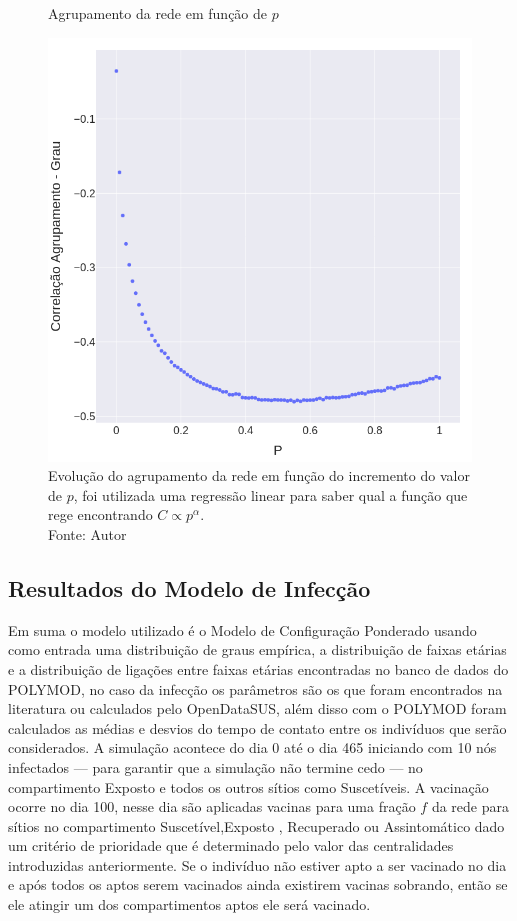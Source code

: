 \begin{figure}[H]
    \centering
    \captionsetup{font=normalsize,skip=0.8pt,singlelinecheck=on,labelsep=endash}
    \caption{Agrupamento da rede em função de $p$}
    \includegraphics[scale= 0.5]{figuras/correlation.png}
    \captionsetup{font=small,justification=justified}    \caption*{Evolução do agrupamento da rede em função 
    do incremento do valor de $p$, foi utilizada uma regressão linear para saber qual a função que rege encontrando $C \propto p^{\alpha}$.\\Fonte: Autor}
    \label{fig:correlation}
\end{figure}

\subsection{Resultados do Modelo de Infecção}

Em suma o modelo utilizado é o Modelo de Configuração Ponderado usando como entrada uma distribuição de graus empírica, a distribuição de faixas etárias e a distribuição de ligações entre faixas etárias encontradas no banco de dados do POLYMOD, no caso da infecção os parâmetros são os que foram encontrados na literatura ou calculados pelo OpenDataSUS, além disso com o POLYMOD foram calculados as médias e desvios do tempo de contato entre os indivíduos que serão considerados. A simulação acontece do dia 0 até o dia 465 iniciando com 10 nós infectados — para garantir que a simulação não termine cedo — no compartimento Exposto e todos os outros sítios como Suscetíveis. A vacinação ocorre no dia 100, nesse dia são aplicadas vacinas para uma fração $f$ da rede para sítios no compartimento Suscetível,Exposto , Recuperado ou Assintomático dado um critério de prioridade que é determinado pelo valor das centralidades introduzidas anteriormente. Se o indivíduo não estiver apto a ser vacinado no dia e após todos os aptos serem vacinados ainda existirem vacinas sobrando, então se ele atingir um dos compartimentos aptos ele será vacinado.


